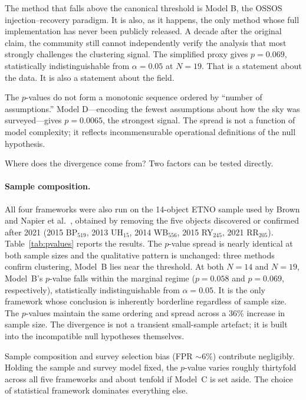 \documentclass[usenatbib]{mnras}
\begin{document}
The method that falls above the canonical threshold is Model B, the OSSOS injection--recovery paradigm. It is also, as it happens, the only method whose full implementation has never been publicly released. A decade after the original claim, the community still cannot independently verify the analysis that most strongly challenges the clustering signal. The simplified proxy gives $p=0.069$, statistically indistinguishable from $\alpha=0.05$ at $N=19$. That is a statement about the data. It is also a statement about the field.

The $p$-values do not form a monotonic sequence ordered by ``number of assumptions.'' Model D---encoding the fewest assumptions about how the sky was surveyed---gives $p=0.0065$, the strongest signal. The spread is not a function of model complexity; it reflects incommensurable operational definitions of the null hypothesis.

Where does the divergence come from? Two factors can be tested directly.

\paragraph{Sample composition.}
All four frameworks were also run on the 14-object ETNO sample used by Brown \cite{brown2019} and Napier et al.\ \cite{napier2021}, obtained by removing the five objects discovered or confirmed after 2021 (2015 BP$_{519}$, 2013 UH$_{15}$, 2014 WB$_{556}$, 2015 RY$_{245}$, 2021 RR$_{205}$). Table~\ref{tab:pvalues} reports the results. The $p$-value spread is nearly identical at both sample sizes and the qualitative pattern is unchanged: three methods confirm clustering, Model~B lies near the threshold. At both $N=14$ and $N=19$, Model~B's $p$-value falls within the marginal regime ($p=0.058$ and $p=0.069$, respectively), statistically indistinguishable from $\alpha=0.05$. It is the only framework whose conclusion is inherently borderline regardless of sample size. The $p$-values maintain the same ordering and spread across a 36\% increase in sample size. The divergence is not a transient small-sample artefact; it is built into the incompatible null hypotheses themselves.

Sample composition and survey selection bias (FPR $\sim6\%$) contribute negligibly. Holding the sample and survey model fixed, the $p$-value varies roughly thirtyfold across all five frameworks and about tenfold if Model~C is set aside. The choice of statistical framework dominates everything else.
\end{document}
